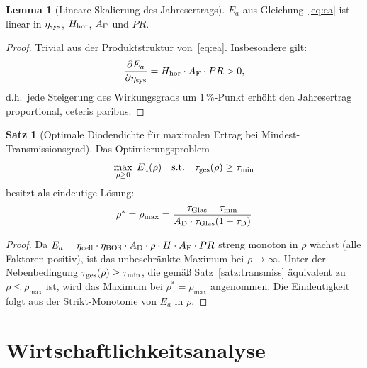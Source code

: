 ﻿\documentclass[a4paper,12pt]{article}
\theoremstyle{definition}
\newtheorem{lemma}[definition]{Lemma}
\newtheorem{satz}[definition]{Satz}
\theoremstyle{remark}
\begin{document}
\begin{lemma}[Lineare Skalierung des Jahresertrags]
\label{lem:linear}
$E_a$ aus Gleichung~\eqref{eq:ea} ist linear in $\eta_{\rm sys}$,
$H_{\rm hor}$, $A_{\rm F}$ und $PR$.
\end{lemma}

\begin{proof}
Trivial aus der Produktstruktur von~\eqref{eq:ea}. Insbesondere gilt:
\begin{equation*}
  \frac{\partial E_a}{\partial \eta_{\rm sys}} = H_{\rm hor} \cdot A_{\rm F} \cdot PR > 0,
\end{equation*}
d.h.~jede Steigerung des Wirkungsgrads um $1\,\%$-Punkt erhöht den Jahresertrag
proportional, ceteris paribus.
\end{proof}

\begin{satz}[Optimale Diodendichte für maximalen Ertrag bei Mindest-Transmissionsgrad]
\label{satz:opt}
Das Optimierungsproblem
\begin{equation}
  \max_{\rho \geq 0} \; E_a(\rho) \quad \text{s.t.} \quad \tau_{\rm ges}(\rho) \geq \tau_{\min}
  \label{eq:optproblem}
\end{equation}
besitzt als eindeutige Lösung:
\begin{equation}
  \rho^* = \rho_{\max} = \frac{\tau_{\rm Glas} - \tau_{\min}}{A_{\rm D} \cdot \tau_{\rm Glas}(1-\tau_{\rm D})}
  \label{eq:rhoopt}
\end{equation}
\end{satz}

\begin{proof}
Da $E_a = \eta_{\rm cell} \cdot \eta_{\rm BOS} \cdot A_{\rm D} \cdot \rho \cdot H \cdot A_{\rm F} \cdot PR$
streng monoton in $\rho$ wächst (alle Faktoren positiv), ist das unbeschränkte
Maximum bei $\rho \to \infty$. Unter der Nebenbedingung
$\tau_{\rm ges}(\rho) \geq \tau_{\min}$, die gemäß Satz~\ref{satz:transmiss}
äquivalent zu $\rho \leq \rho_{\max}$ ist, wird das Maximum bei
$\rho^* = \rho_{\max}$ angenommen. Die Eindeutigkeit folgt aus der
Strikt-Monotonie von $E_a$ in $\rho$.
\end{proof}

\section{Wirtschaftlichkeitsanalyse}
\label{sec:wirtschaft}
\end{document}

